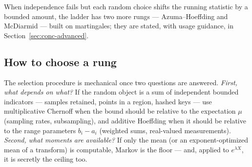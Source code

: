 \begin{widefigure}[t]
\pgfplotsset{compat=1.15}
\caption{Tail decay for a unit-scale random quantity: moment bounds fall polynomially,
independence buys the exponential curve --- the gap that makes
$\operatorname{poly}(n)$-way union bounds affordable.}
\label{fig:conc-tails}
\end{widefigure}


When independence fails but each random choice shifts the running statistic by a bounded
amount, the ladder has two more rungs --- Azuma--Hoeffding and McDiarmid --- built on
martingales; they are stated, with usage guidance, in
Section~\ref{sec:conc-advanced}.

\subsection{How to choose a rung}
\label{sec:conc-choose}

The selection procedure is mechanical once two questions are answered. \emph{First, what
depends on what?} If the random object is a sum of independent bounded indicators ---
samples retained, points in a region, hashed keys --- use multiplicative Chernoff when
the bound should be relative to the expectation $\mu$ (sampling rates, subsampling), and
additive Hoeffding when it should be relative to the range parameters
$b_i - a_i$ (weighted sums, real-valued measurements). \emph{Second, what moments are
available?} If only the mean (or an exponent-optimized mean of a transform) is
computable, Markov is the floor --- and, applied to $e^{\lambda X}$, it is secretly the
ceiling too.

